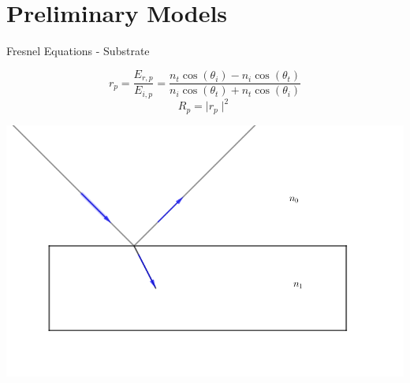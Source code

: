 \documentclass[10pt]{beamer}
\begin{document}
	
	
	
	
	
	\section{Preliminary Models}
	
	\begin{frame}{Fresnel Equations - Substrate}
	
	\begin{minipage}{0.47\textwidth}
	\begin{equation*}
	r_p = \frac{E_{r,p}}{E_{i,p}} = \frac{n_t\cos(\theta_i)-n_i\cos(\theta_t)}{n_i\cos(\theta_t)+n_t\cos(\theta_i)}
	\end{equation*}
	\begin{equation*}
	R_p = \mid r_p \mid ^2 
	\end{equation*}
	\end{minipage}
	\begin{minipage}{0.5\textwidth}
	\includegraphics[scale=0.2]{subrefl.png}
	\end{minipage}
	\end{frame}
	
\end{document}
